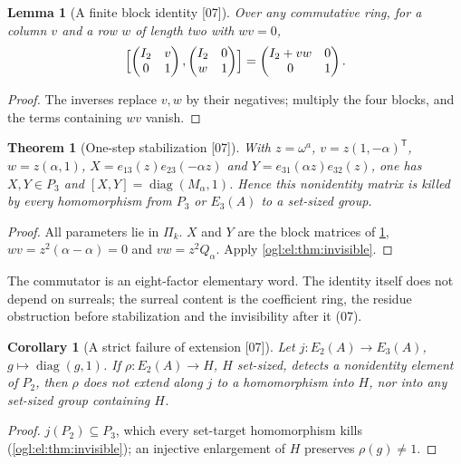 \documentclass[11pt,oneside]{article}
\numberwithin{equation}{section}
\newtheorem{theorem}{Theorem}[section]
\newtheorem{lemma}[lemma]{Lemma}
\newtheorem{corollary}[corollary]{Corollary}
\theoremstyle{definition}
\theoremstyle{remark}
\newcommand{\diag}{\operatorname{diag}}
\newcommand{\src}[1]{\textup{\textsf{\small[#1]}}}
\begin{document}
\begin{lemma}[A finite block identity \src{07}]\label{ogl:el:lem:block}
Over any commutative ring, for a column $v$ and a row $w$ of length two with
$wv=0$,
\[
 \Bigl[\begin{pmatrix}I_2&v\\0&1\end{pmatrix},
 \begin{pmatrix}I_2&0\\w&1\end{pmatrix}\Bigr]
 =\begin{pmatrix}I_2+vw&0\\0&1\end{pmatrix}.
\]
\end{lemma}
\begin{proof}
The inverses replace $v,w$ by their negatives; multiply the four blocks, and the
terms containing $wv$ vanish.
\end{proof}

\begin{theorem}[One-step stabilization \src{07}]\label{ogl:el:thm:stabilize}
With $z=\omega^a$, $v=z(1,-\alpha)^{\mathsf T}$, $w=z(\alpha,1)$,
$X=e_{13}(z)e_{23}(-\alpha z)$ and $Y=e_{31}(\alpha z)e_{32}(z)$, one has
$X,Y\in P_3$ and $[X,Y]=\diag(M_\alpha,1)$. Hence this nonidentity matrix is
killed by every homomorphism from $P_3$ or $E_3(A)$ to a set-sized group.
\end{theorem}
\begin{proof}
All parameters lie in $\Pi_k$. $X$ and $Y$ are the block matrices of
\cref{ogl:el:lem:block}, $wv=z^2(\alpha-\alpha)=0$ and $vw=z^2Q_\alpha$. Apply
\cref{ogl:el:thm:invisible}.
\end{proof}

The commutator is an eight-factor elementary word. The identity itself does
not depend on surreals; the surreal content is the coefficient ring, the
residue obstruction before stabilization and the invisibility after it (07).

\begin{corollary}[A strict failure of extension \src{07}]\label{ogl:el:cor:noextend}
Let $j:E_2(A)\to E_3(A)$, $g\mapsto\diag(g,1)$. If $\rho:E_2(A)\to H$, $H$
set-sized, detects a nonidentity element of $P_2$, then $\rho$ does not extend
along $j$ to a homomorphism into $H$, nor into any set-sized group containing
$H$.
\end{corollary}
\begin{proof}
$j(P_2)\subseteq P_3$, which every set-target homomorphism kills
(\cref{ogl:el:thm:invisible}); an injective enlargement of $H$ preserves
$\rho(g)\ne1$.
\end{proof}
\end{document}
